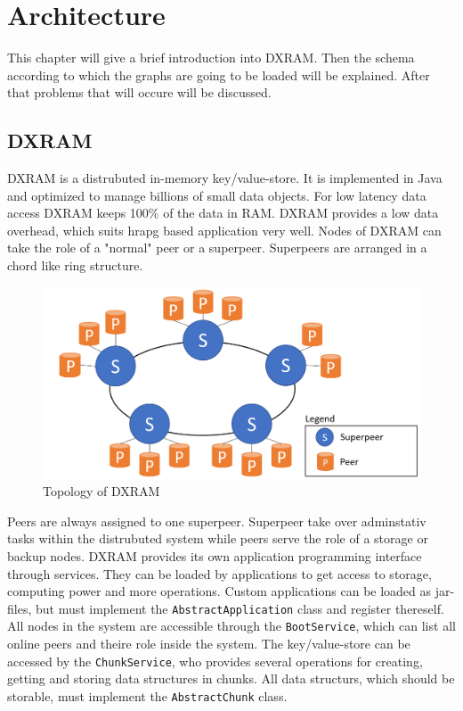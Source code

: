 \chapter{Architecture}
\label{Architecture}
This chapter will give a brief introduction into DXRAM. Then the schema according to which the graphs are going to be loaded will be explained. After that problems that will occure will be discussed. 
\section{DXRAM}
DXRAM is a distrubuted in-memory key/value-store. 
It is implemented in Java and optimized to manage billions of small data objects. 
For low latency data access DXRAM keeps 100\% of the data in RAM.
DXRAM provides a low data overhead, which suits hrapg based application very well.
Nodes of DXRAM can take the role of a "normal" peer or a superpeer. Superpeers are arranged in a chord like ring structure. \begin{figure}[H]
	\centering
	\includegraphics[width=1.0\linewidth]{img/topology.png}
	\caption{Topology of DXRAM}
	\label{topology}
\end{figure}
Peers are always assigned to one superpeer. Superpeer take over adminstativ tasks within the distrubuted system while peers serve the role of a storage or backup nodes.
DXRAM provides its own application programming interface through services. They can be loaded by applications to get access to storage, computing power and more operations. Custom applications can be loaded as jar-files, but must implement the \texttt{AbstractApplication} class and register thereself. All nodes in the system are accessible through the \texttt{BootService}, which can list all online peers and theire role inside the system.
The key/value-store can be accessed by the \texttt{ChunkService}, who provides several operations for creating, getting and storing data structures in chunks. All data structurs, which should be storable, must implement the \texttt{AbstractChunk} class.\\

